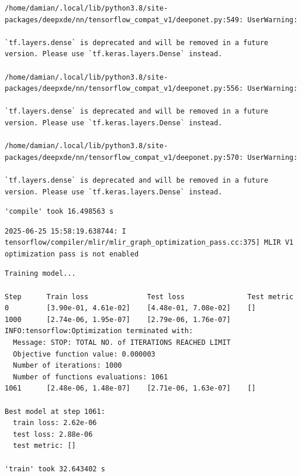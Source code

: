 \documentclass[
  spanish,
  us-letterpaper,
  DIV=11,
  numbers=noendperiod]{scrreprt}
\theoremstyle{plain}
\theoremstyle{definition}
\theoremstyle{remark}
\begin{document}
\begin{verbatim}
/home/damian/.local/lib/python3.8/site-packages/deepxde/nn/tensorflow_compat_v1/deeponet.py:549: UserWarning:

`tf.layers.dense` is deprecated and will be removed in a future version. Please use `tf.keras.layers.Dense` instead.

/home/damian/.local/lib/python3.8/site-packages/deepxde/nn/tensorflow_compat_v1/deeponet.py:556: UserWarning:

`tf.layers.dense` is deprecated and will be removed in a future version. Please use `tf.keras.layers.Dense` instead.

/home/damian/.local/lib/python3.8/site-packages/deepxde/nn/tensorflow_compat_v1/deeponet.py:570: UserWarning:

`tf.layers.dense` is deprecated and will be removed in a future version. Please use `tf.keras.layers.Dense` instead.
\end{verbatim}

\begin{verbatim}
'compile' took 16.498563 s
\end{verbatim}

\begin{verbatim}
2025-06-25 15:58:19.638744: I tensorflow/compiler/mlir/mlir_graph_optimization_pass.cc:375] MLIR V1 optimization pass is not enabled
\end{verbatim}

\begin{verbatim}
Training model...

Step      Train loss              Test loss               Test metric
0         [3.90e-01, 4.61e-02]    [4.48e-01, 7.08e-02]    []  
1000      [2.74e-06, 1.95e-07]    [2.79e-06, 1.76e-07]        
INFO:tensorflow:Optimization terminated with:
  Message: STOP: TOTAL NO. of ITERATIONS REACHED LIMIT
  Objective function value: 0.000003
  Number of iterations: 1000
  Number of functions evaluations: 1061
1061      [2.48e-06, 1.48e-07]    [2.71e-06, 1.63e-07]    []  

Best model at step 1061:
  train loss: 2.62e-06
  test loss: 2.88e-06
  test metric: []

'train' took 32.643402 s
\end{verbatim}
\end{document}
